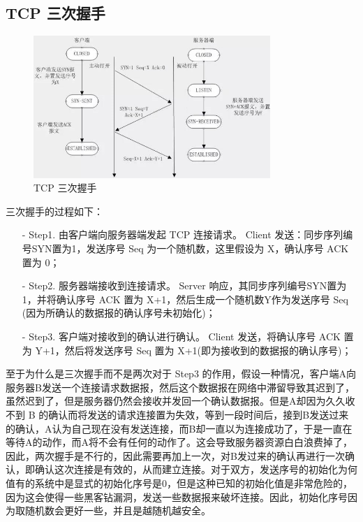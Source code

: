 \subsection{TCP 三次握手}

\begin{figure}[htb]
\centering 
\includegraphics[width=0.80\textwidth]{img/newch1m3.png} 
\caption{TCP 三次握手}
\label{Test}
\end{figure}

三次握手的过程如下：

\begin{itemize}
\item [-] Step1. 由客户端向服务器端发起 TCP 连接请求。 Client 发送：同步序列编号SYN置为1，发送序号 Seq 为一个随机数，这里假设为 X，确认序号 ACK 置为 0；
\item [-] Step2. 服务器端接收到连接请求。 Server 响应，其同步序列编号SYN置为1，并将确认序号 ACK 置为 X+1，然后生成一个随机数Y作为发送序号 Seq (因为所确认的数据报的确认序号未初始化)；
\item [-] Step3. 客户端对接收到的确认进行确认。 Client 发送，将确认序号 ACK 置为 Y+1，然后将发送序号 Seq 置为 X+1(即为接收到的数据报的确认序号)；
\end{itemize}

至于为什么是三次握手而不是两次对于 Step3 的作用，假设一种情况，客户端A向服务器B发送一个连接请求数据报，然后这个数据报在网络中滞留导致其迟到了，虽然迟到了，但是服务器仍然会接收并发回一个确认数据报。但是A却因为久久收不到 B 的确认而将发送的请求连接置为失效，等到一段时间后，接到B发送过来的确认，A认为自己现在没有发送连接，而B却一直以为连接成功了，于是一直在等待A的动作，而A将不会有任何的动作了。这会导致服务器资源白白浪费掉了，因此，两次握手是不行的，因此需要再加上一次，对B发过来的确认再进行一次确认，即确认这次连接是有效的，从而建立连接。对于双方，发送序号的初始化为何值有的系统中是显式的初始化序号是0，但是这种已知的初始化值是非常危险的，因为这会使得一些黑客钻漏洞，发送一些数据报来破坏连接。因此，初始化序号因为取随机数会更好一些，并且是越随机越安全。

